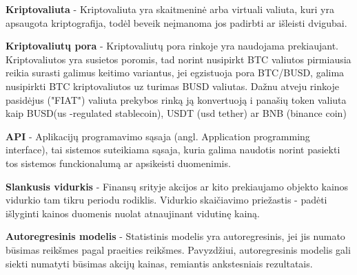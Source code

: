 \documentclass{VUMIFInfKursinis}
\begin{document}
\textbf{Kriptovaliuta} - Kriptovaliuta yra skaitmeninė arba virtuali valiuta, kuri yra apsaugota kriptografija, todėl beveik neįmanoma jos padirbti ar išleisti dvigubai.

\textbf{Kriptovaliutų pora} - Kriptovaliutų pora rinkoje yra naudojama prekiaujant. Kriptovaliutos yra susietos poromis, tad norint nusipirkt BTC valiutos pirmiausia reikia surasti 
galimus keitimo variantus, jei egzistuoja pora BTC/BUSD, galima nusipirkti BTC kriptovaliutos uz turimas BUSD valiutas. Dažnu atveju rinkoje pasidėjus ("FIAT") valiuta
prekybos rinką ją konvertuoją i panašių token valiuta kaip BUSD(us -regulated stablecoin), USDT (usd tether) ar BNB (binance coin)

\textbf{API} - Aplikacijų programavimo sąsaja (angl. Application programming interface), tai sistemos suteikiama sąsaja, kuria galima naudotis norint pasiekti tos sistemos
funckionalumą ar apsikeisti duomenimis.

\textbf{Slankusis vidurkis} - Finansų srityje akcijos ar kito prekiaujamo objekto kainos vidurkio tam tikru periodu rodiklis. Vidurkio skaičiavimo priežastis - padėti išlyginti
kainos duomenis nuolat atnaujinant vidutinę kainą.

\textbf{Autoregresinis modelis} - Statistinis modelis yra autoregresinis, jei jis numato būsimas reikšmes pagal praeities reikšmes. Pavyzdžiui, autoregresinis modelis gali
siekti numatyti būsimas akcijų kainas, remiantis ankstesniais rezultatais.

\printbibliography[heading=bibintoc] %

\appendix  %

\end{document}

